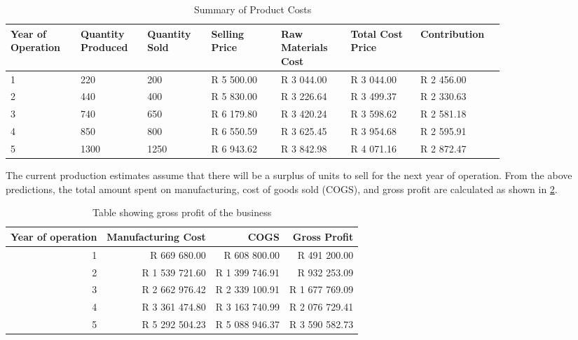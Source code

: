 \begin{table}[htbp]
  \centering
  \caption{Summary of Product Costs}
    \begin{tabular}{p{0.12\linewidth}p{0.11\linewidth}p{0.11\linewidth}p{0.12\linewidth}p{0.12\linewidth}p{0.12\linewidth}p{0.12\linewidth}}
    \toprule
    \raggedright{Year of Operation} & Quantity Produced & Quantity Sold & Selling Price & Raw Materials Cost & \raggedright{Total Cost Price} & Contribution \\
    \midrule
    1     & 220   & 200   & R 5 500.00 & R 3 044.00 & R 3 044.00 & R 2 456.00 \\
    2     & 440   & 400   & R 5 830.00 & R 3 226.64 & R 3 499.37 & R 2 330.63 \\
    3     & 740   & 650   & R 6 179.80 & R 3 420.24 & R 3 598.62 & R 2 581.18 \\
    4     & 850   & 800   & R 6 550.59 & R 3 625.45 & R 3 954.68 & R 2 595.91 \\
    5     & 1300  & 1250  & R 6 943.62 & R 3 842.98 & R 4 071.16 & R 2 872.47 \\
    \bottomrule
    \end{tabular}%
  \label{tab:ProductSales}%
\end{table}%

The current production estimates assume that there will be a surplus of units to sell for the next year of operation. From the above predictions, the total amount spent on manufacturing, cost of goods sold (COGS), and gross profit are calculated as shown in \cref{tab:GrossProfit}. 

\begin{table}[htbp]
  \centering
  \caption{Table showing gross profit of the business}
    \begin{tabular}{rrrr}
    \toprule
    Year of operation & Manufacturing Cost & COGS  & Gross Profit \\
    \midrule
    1     & R 669 680.00 & R 608 800.00 & R 491 200.00 \\
    2     & R 1 539 721.60 & R 1 399 746.91 & R 932 253.09 \\
    3     & R 2 662 976.42 & R 2 339 100.91 & R 1 677 769.09 \\
    4     & R 3 361 474.80 & R 3 163 740.99 & R 2 076 729.41 \\
    5     & R 5 292 504.23 & R 5 088 946.37 & R 3 590 582.73 \\
    \bottomrule
    \end{tabular}%
  \label{tab:GrossProfit}%
\end{table}%

